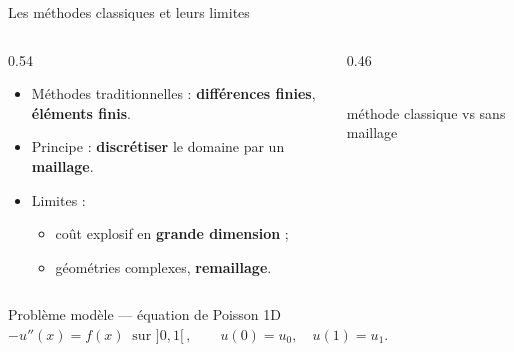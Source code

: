 \documentclass[11pt,aspectratio=43]{beamer}
\begin{document}
\begin{frame}{Les méthodes classiques et leurs limites}
  \begin{columns}[T]
    \begin{column}{0.54\textwidth}
      \begin{itemize}
        \item Méthodes traditionnelles : \textbf{différences finies},
              \textbf{éléments finis}.
        \item Principe : \textbf{discrétiser} le domaine par un \textbf{maillage}.
        \item Limites :
          \begin{itemize}
            \item coût explosif en \textbf{grande dimension} ;
            \item géométries complexes, \textbf{remaillage}.
          \end{itemize}
      \end{itemize}
    \end{column}
    \begin{column}{0.46\textwidth}
      \centering
      \\[1.2em]
      {\scriptsize\color{dblue} méthode classique \;vs\; sans maillage}
    \end{column}
  \end{columns}
  \vfill
  \begin{block}{Problème modèle — équation de Poisson 1D}
    \centering
    $\displaystyle -u''(x)=f(x)\ \text{ sur } ]0,1[\,,
      \qquad u(0)=u_0,\quad u(1)=u_1.$
  \end{block}
\end{frame}
\end{document}
